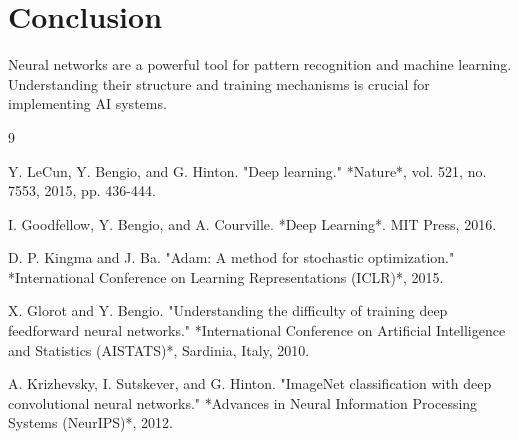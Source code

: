 \documentclass{article}
\begin{document}
\section{Conclusion} \label{sec:conclusion}
Neural networks are a powerful tool for pattern recognition and machine learning. Understanding their structure and training mechanisms is crucial for implementing AI systems.

\begin{thebibliography}{9}

 Y. LeCun, Y. Bengio, and G. Hinton. "Deep learning." *Nature*, vol. 521, no. 7553, 2015, pp. 436-444.

 I. Goodfellow, Y. Bengio, and A. Courville. *Deep Learning*. MIT Press, 2016.

 D. P. Kingma and J. Ba. "Adam: A method for stochastic optimization." *International Conference on Learning Representations (ICLR)*, 2015.

 X. Glorot and Y. Bengio. "Understanding the difficulty of training deep feedforward neural networks." *International Conference on Artificial Intelligence and Statistics (AISTATS)*, Sardinia, Italy, 2010.

 A. Krizhevsky, I. Sutskever, and G. Hinton. "ImageNet classification with deep convolutional neural networks." *Advances in Neural Information Processing Systems (NeurIPS)*, 2012.

\end{thebibliography}
\end{document}
